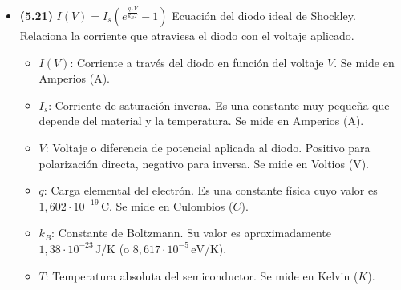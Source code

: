 \documentclass{article}
\begin{document}
\begin{itemize}
				\item \textbf{(5.21)} $\boxed{I(V) = I_s \left( e^{\frac{q \cdot V}{k_B T}} - 1 \right)}$ Ecuación del diodo ideal de Shockley. Relaciona la corriente que atraviesa el diodo con el voltaje aplicado.
					\begin{itemize}
						\item $I(V)$: Corriente a través del diodo en función del voltaje $V$. Se mide en Amperios (A).
						\item $I_s$: Corriente de saturación inversa. Es una constante muy pequeña que depende del material y la temperatura. Se mide en Amperios (A).
						\item $V$: Voltaje o diferencia de potencial aplicada al diodo. Positivo para polarización directa, negativo para inversa. Se mide en Voltios (V).
						\item $q$: Carga elemental del electrón. Es una constante física cuyo valor es $1,602\cdot10^{-19}\,\text{C}$. Se mide en Culombios ($C$).
						\item $k_B$: Constante de Boltzmann. Su valor es aproximadamente $1,38 \cdot 10^{-23}\,\text{J/K}$ (o $8,617 \cdot 10^{-5}\,\text{eV/K}$).
						\item $T$: Temperatura absoluta del semiconductor. Se mide en Kelvin ($K$).
					\end{itemize}
			\end{itemize}
\end{document}
